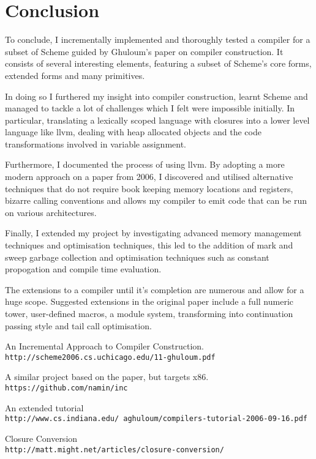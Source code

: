 \documentclass{article}
\begin{document}
\section{Conclusion}

To conclude, I incrementally implemented and thoroughly tested a compiler for a subset of Scheme guided by Ghuloum's paper on compiler construction. It consists of several interesting elements, featuring a subset of Scheme's core forms, extended forms and many primitives.

In doing so I furthered my insight into compiler construction, learnt Scheme and managed to tackle a lot of challenges which I felt were impossible initially. In particular, translating a lexically scoped language with closures into a lower level language like llvm, dealing with heap allocated objects and the code transformations involved in variable assignment.

Furthermore, I documented the process of using llvm. By adopting a more modern approach on a paper from 2006, I discovered and utilised alternative techniques that do not require book keeping memory locations and registers, bizarre calling conventions and allows my compiler to emit code that can be run on various architectures.

Finally, I extended my project by investigating advanced memory management techniques and optimisation techniques, this led to the addition of mark and sweep garbage collection and optimisation techniques such as constant propogation and compile time evaluation.

The extensions to a compiler until it's completion are numerous and allow for a huge scope. Suggested extensions in the original paper include a full numeric tower, user-defined macros, a module system, transforming into continuation passing style and tail call optimisation. 

\begin{thebibliography}{5}

An Incremental Approach to Compiler Construction.
\\\texttt{http://scheme2006.cs.uchicago.edu/11-ghuloum.pdf}

A similar project based on the paper, but targets x86.
\\\texttt{https://github.com/namin/inc}

An extended tutorial 
\\\texttt{http://www.cs.indiana.edu/~aghuloum/compilers-tutorial-2006-09-16.pdf}

Closure Conversion
\\\texttt{http://matt.might.net/articles/closure-conversion/}


\end{thebibliography}  
\end{document}

